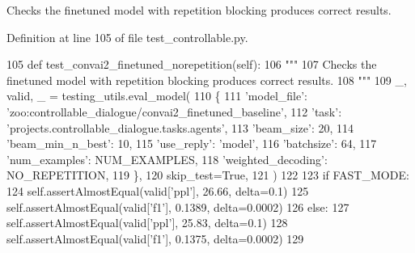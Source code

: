 \begin{DoxyVerb}Checks the finetuned model with repetition blocking produces correct results.
\end{DoxyVerb}
 

Definition at line 105 of file test\+\_\+controllable.\+py.


\begin{DoxyCode}
105     \textcolor{keyword}{def }test\_convai2\_finetuned\_norepetition(self):
106         \textcolor{stringliteral}{"""}
107 \textcolor{stringliteral}{        Checks the finetuned model with repetition blocking produces correct results.}
108 \textcolor{stringliteral}{        """}
109         \_, valid, \_ = testing\_utils.eval\_model(
110             \{
111                 \textcolor{stringliteral}{'model\_file'}: \textcolor{stringliteral}{'zoo:controllable\_dialogue/convai2\_finetuned\_baseline'},
112                 \textcolor{stringliteral}{'task'}: \textcolor{stringliteral}{'projects.controllable\_dialogue.tasks.agents'},
113                 \textcolor{stringliteral}{'beam\_size'}: 20,
114                 \textcolor{stringliteral}{'beam\_min\_n\_best'}: 10,
115                 \textcolor{stringliteral}{'use\_reply'}: \textcolor{stringliteral}{'model'},
116                 \textcolor{stringliteral}{'batchsize'}: 64,
117                 \textcolor{stringliteral}{'num\_examples'}: NUM\_EXAMPLES,
118                 \textcolor{stringliteral}{'weighted\_decoding'}: NO\_REPETITION,
119             \},
120             skip\_test=\textcolor{keyword}{True},
121         )
122 
123         \textcolor{keywordflow}{if} FAST\_MODE:
124             self.assertAlmostEqual(valid[\textcolor{stringliteral}{'ppl'}], 26.66, delta=0.1)
125             self.assertAlmostEqual(valid[\textcolor{stringliteral}{'f1'}], 0.1389, delta=0.0002)
126         \textcolor{keywordflow}{else}:
127             self.assertAlmostEqual(valid[\textcolor{stringliteral}{'ppl'}], 25.83, delta=0.1)
128             self.assertAlmostEqual(valid[\textcolor{stringliteral}{'f1'}], 0.1375, delta=0.0002)
129 
\end{DoxyCode}
\mbox{\label{classtest__controllable_1_1TestControllableDialogue_ab33835878eb846bcc457a90072bb06bd}} 
